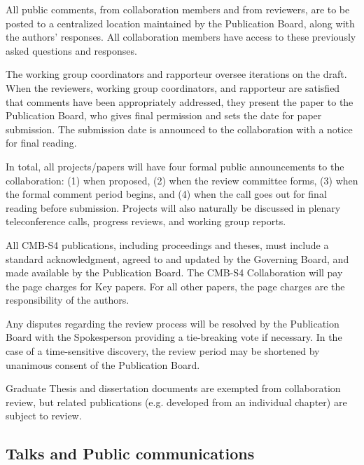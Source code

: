 All public comments, from collaboration members and from reviewers, are to be posted to a centralized location maintained by the Publication Board, along with the authors' responses.  All collaboration members have access to these previously asked questions and responses.

The working group coordinators and rapporteur oversee iterations on the draft.  When the reviewers, working group coordinators, and rapporteur are satisfied that comments have been appropriately addressed, they present the paper to the Publication Board, who gives final permission and sets the date for paper submission.  The submission date is announced to the collaboration with a notice for final reading.  

In total, all projects/papers will have four formal public announcements to the collaboration:
(1) when proposed,
(2) when the review committee forms,
(3) when the formal comment period begins, and
(4) when the call goes out for final reading before submission.
  Projects will also naturally be discussed in plenary teleconference calls, progress reviews, and working group reports.

All CMB-S4 publications, including proceedings and theses, must include a standard acknowledgment, agreed to and updated by the Governing Board, and made available by the Publication Board.  The CMB-S4 Collaboration will pay the page charges for Key papers. For all other papers, the page charges are the responsibility of the authors.

Any disputes regarding the review process will be resolved by the Publication Board with the Spokesperson providing a tie-breaking vote if necessary. In the case of a time-sensitive discovery, the review period may be shortened by unanimous consent of the Publication Board.

Graduate Thesis and dissertation documents are exempted from collaboration review, but related publications (e.g. developed from an individual chapter) are subject to review.

\subsection{Talks and Public communications}

